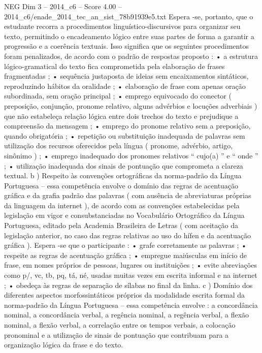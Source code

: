 \begin{textsample}{NEG Dim 3 – 2014\_c6 – Score 4.00 – 2014\_c6/enade\_2014\_tec\_an\_sist\_78b91939e5.txt}
Espera -se, portanto, que o estudante recorra a procedimentos linguístico-discursivos para organizar seu texto, permitindo o encadeamento lógico entre suas partes de forma a garantir a progressão e a coerência textuais.
Isso significa que os seguintes procedimentos foram penalizados, de acordo com o padrão de respostas proposto : • a estrutura lógico-gramatical do texto fica comprometida pela elaboração de frases fragmentadas ; • sequência justaposta de ideias sem encaixamentos sintáticos, reproduzindo hábitos da oralidade ; • elaboração de frase com apenas oração subordinada, sem oração principal ; • emprego equivocado do conector ( preposição, conjunção, pronome relativo, alguns advérbios e locuções adverbiais ) que não estabeleça relação lógica entre dois trechos do texto e prejudique a compreensão da mensagem ; • emprego do pronome relativo sem a preposição, quando obrigatória ; • repetição ou substituição inadequada de palavras sem utilização dos recursos oferecidos pela língua ( pronome, advérbio, artigo, sinônimo ) ; • emprego inadequado dos pronomes relativos “ cujo(a) ” e “ onde ” ; • utilização inadequada dos sinais de pontuação que comprometa a clareza textual. b ) Respeito às convenções ortográficas da norma-padrão da Língua Portuguesa – essa competência envolve o domínio das regras de acentuação gráfica e da grafia padrão das palavras ( com ausência de abreviaturas próprias da linguagem da internet ), de acordo com as convenções estabelecidas pela legislação em vigor e consubstanciadas no Vocabulário Ortográfico da Língua Portuguesa, editado pela Academia Brasileira de Letras ( com aceitação da legislação anterior, no caso das regras relativas ao uso do hífen e da acentuação gráfica ).
Espera -se que o participante : • grafe corretamente as palavras ; • respeite as regras de acentuação gráfica ; • empregue maiúsculas em início de frase, em nomes próprios de pessoas, lugares ou instituições ; • evite abreviações como p/, vc, tb, pq, tá, né, usadas muitas vezes em escrita informal e na internet ; • obedeça às regras de separação de sílabas no final da linha. c ) Domínio dos diferentes aspectos morfossintáticos próprios da modalidade escrita formal da norma-padrão da Língua Portuguesa – essa competência envolve : a concordância nominal, a concordância verbal, a regência nominal, a regência verbal, a flexão nominal, a flexão verbal, a correlação entre os tempos verbais, a colocação pronominal e a utilização de sinais de pontuação que contribuam para a organização lógica da frase e do texto.

\end{textsample}
